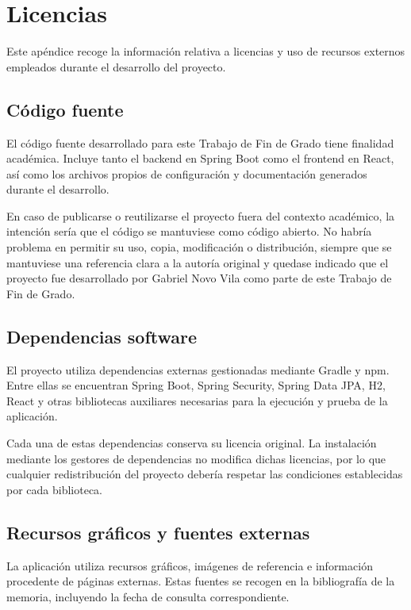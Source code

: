 \chapter{Licencias}
\label{apendice_licencias}

Este apéndice recoge la información relativa a licencias y uso de recursos externos empleados durante el desarrollo del proyecto.

\section{Código fuente}

El código fuente desarrollado para este Trabajo de Fin de Grado tiene finalidad académica. Incluye tanto el backend en Spring Boot como el frontend en React, así como los archivos propios de configuración y documentación generados durante el desarrollo.

En caso de publicarse o reutilizarse el proyecto fuera del contexto académico, la intención sería que el código se mantuviese como código abierto. No habría problema en permitir su uso, copia, modificación o distribución, siempre que se mantuviese una referencia clara a la autoría original y quedase indicado que el proyecto fue desarrollado por Gabriel Novo Vila como parte de este Trabajo de Fin de Grado.

\section{Dependencias software}

El proyecto utiliza dependencias externas gestionadas mediante Gradle y npm. Entre ellas se encuentran Spring Boot, Spring Security, Spring Data JPA, H2, React y otras bibliotecas auxiliares necesarias para la ejecución y prueba de la aplicación.

Cada una de estas dependencias conserva su licencia original. La instalación mediante los gestores de dependencias no modifica dichas licencias, por lo que cualquier redistribución del proyecto debería respetar las condiciones establecidas por cada biblioteca.

\section{Recursos gráficos y fuentes externas}

La aplicación utiliza recursos gráficos, imágenes de referencia e información procedente de páginas externas. Estas fuentes se recogen en la bibliografía de la memoria, incluyendo la fecha de consulta correspondiente.

